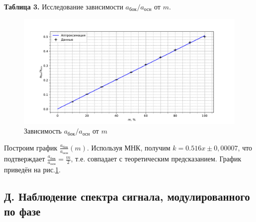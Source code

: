 \documentclass[a4paper,12pt]{article}
\begin{document}
\begin{enumerate}
\begin{center}
\textbf{Таблица 3.} Исследование зависимости $a_{\text{бок}}/a_{\text{осн}}$ от $m$.
\end{center}
\begin{figure}[h]
    \centering
    \includegraphics[width=\textwidth]{grafic3.pdf}
    \caption{Зависимость $a_{\text{бок}}/a_{\text{осн}}$ от $m$}
    \label{grafic3}
\end{figure}
Построим график $\frac{a_{\text{бок}}}{a_{\text{осн}}}(m)$. Используя МНК, получим $k=0.516x\pm0,00007$, что подтверждает $\frac{a_{\text{бок}}}{a_{\text{осн}}}=\frac{m}{2}$, т.е. совпадает с теоретическим предсказанием. График приведён на рис.\ref{grafic3}.




\end{enumerate}








\newpage



\subsection*{Д. Наблюдение спектра сигнала, модулированного по фазе}
\end{document}
